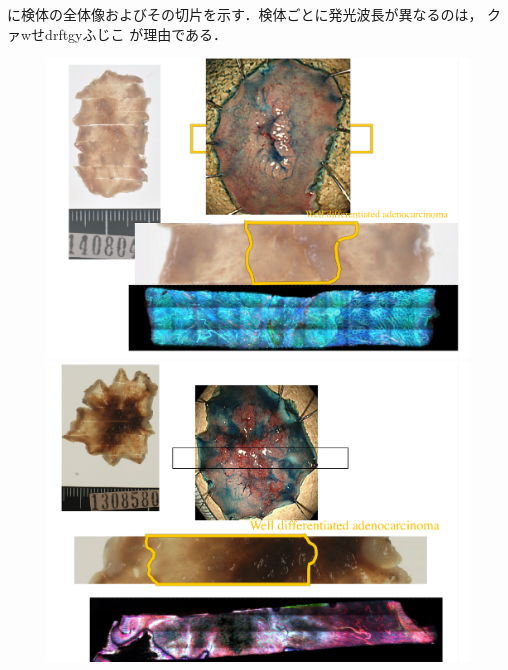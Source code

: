 に検体の全体像およびその切片を示す．検体ごとに発光波長が異なるのは，
クァwせdrftgyふじこ
が理由である．

\begin{figure}[H]
	\centering
	
	\begin{minipage}{0.45\columnwidth}
		\centering
		\includegraphics[clip, angle=270, width=\linewidth]{fig/raw_data/summary/C-013}
	\end{minipage}
	\begin{minipage}{0.45\linewidth}
		\centering
	\end{minipage}
	\begin{minipage}{0.45\columnwidth}
		\centering
		\includegraphics[clip, angle=270, width=\linewidth]{fig/raw_data/summary/C-009}

\end{minipage}
\end{figure}
